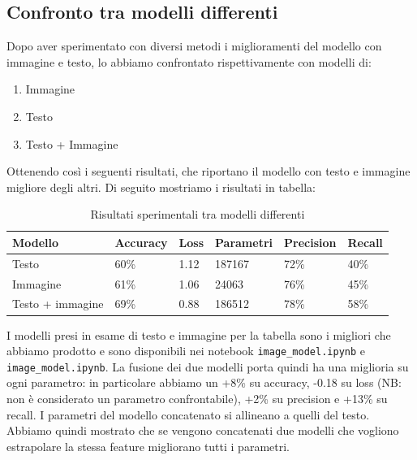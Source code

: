 \documentclass{article}
\begin{document}
\subsection{Confronto tra modelli differenti}

Dopo aver sperimentato con diversi metodi i miglioramenti del modello con immagine e testo, lo abbiamo confrontato rispettivamente con modelli di:
\begin{enumerate}
    \item Immagine
    \item Testo
    \item Testo + Immagine
\end{enumerate}

Ottenendo così i seguenti risultati, che riportano il modello con testo e immagine migliore degli altri. Di seguito mostriamo i risultati in tabella:


\begin{table}[H]
\begin{adjustwidth}{-0.5cm}{}
\centering
\begin{tabular}{@{}llllll@{}}
\toprule
\textbf{Modello} & 
\textbf{Accuracy} &
\textbf{Loss} &
\textbf{Parametri} &
\textbf{Precision} &
\textbf{Recall}
\\ \midrule
 Testo & 60\%  & 1.12 & 187167  & 72\% & 40\%  \\
 Immagine & 61\% & 1.06 & 24063 & 76\% & 45\% \\
 Testo + immagine & 69\% & 0.88 & 186512 & 78\% & 58\% \\
\bottomrule
\end{tabular}
\caption{Risultati sperimentali tra modelli differenti}
\label{tab:results}
\end{adjustwidth}
\end{table}


I modelli presi in esame di testo e immagine per la tabella sono i migliori che abbiamo prodotto e sono disponibili nei notebook \verb|image_model.ipynb| e \verb|image_model.ipynb|. La fusione dei due modelli porta quindi ha una miglioria su ogni parametro: in particolare abbiamo un +8\% su accuracy, -0.18 su loss (NB: non è considerato un parametro confrontabile), +2\% su precision e +13\% su recall. I parametri del modello concatenato si allineano a quelli del testo. Abbiamo quindi mostrato che se vengono concatenati due modelli che vogliono estrapolare la stessa feature migliorano tutti i parametri.
\end{document}
